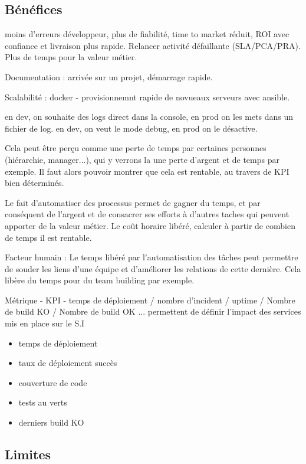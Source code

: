 
\subsection*{Bénéfices}


moins d'erreurs développeur, plus de fiabilité, time to market réduit, ROI avec confiance et livraison plus rapide. Relancer activité défaillante (SLA/PCA/PRA). Plus de temps pour la valeur métier. 

Documentation : arrivée sur un projet, démarrage rapide.

Scalabilité : docker - provisionnemnt rapide de novueaux serveurs avec ansible.

en dev, on souhaite des logs direct dans la console, en prod on les mets dans un fichier de log.
en dev, on veut le mode debug, en prod on le désactive.

Cela peut être perçu comme une perte de temps par certaines personnes (hiérarchie, manager...), qui y verrons la une perte d'argent et de temps par exemple. Il faut alors pouvoir montrer que cela est rentable, au travers de \gls{KPI} bien déterminés.

Le fait d'automatiser des processus permet de gagner du temps, et par conséquent de l'argent et de consacrer ses efforts à d'autres taches qui peuvent apporter de la valeur métier. Le coût horaire libéré, calculer à partir de combien de temps il est rentable.

Facteur humain : Le temps libéré par l'automatisation des tâches peut permettre de souder les liens d'une équipe et d'améliorer les relations de cette dernière. Cela libère du temps pour du team building par exemple.

Métrique - KPI - temps de déploiement / nombre d'incident / uptime / Nombre de build KO / Nombre de build OK ... permettent de définir l'impact des services mis en place sur le S.I

\begin{itemize}
	\item temps de déploiement
	\item taux de déploiement succès
	\item couverture de code
	\item tests au verts
	\item derniers build KO
\end{itemize}

\subsection*{Limites}

